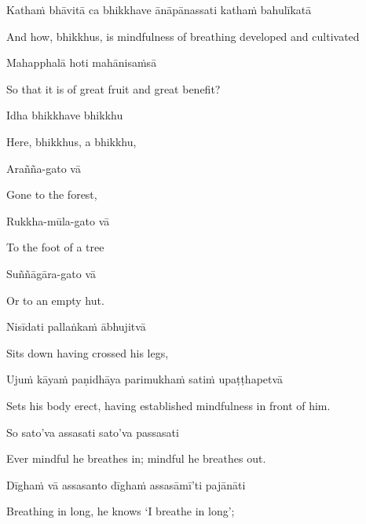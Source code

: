 Kathaṁ bhāvitā ca bhikkhave ānāpānassati kathaṁ bahulīkatā

\begin{english}
  And how, bhikkhus, is mindfulness of breathing developed and cultivated
\end{english}

Mahapphalā hoti mahānisaṁsā

\begin{english}
  So that it is of great fruit and great benefit?
\end{english}

Idha bhikkhave bhikkhu

\begin{english}
  Here, bhikkhus, a bhikkhu,
\end{english}

Arañña-gato vā

\begin{english}
  Gone to the forest,
\end{english}

Rukkha-mūla-gato vā

\begin{english}
  To the foot of a tree
\end{english}

Suññāgāra-gato vā

\begin{english}
  Or to an empty hut.
\end{english}

Nisīdati pallaṅkaṁ ābhujitvā

\begin{english}
  Sits down having crossed his legs,
\end{english}

Ujuṁ kāyaṁ paṇidhāya parimukhaṁ satiṁ upaṭṭhapetvā

\begin{english}
  Sets his body erect, having established mindfulness in front of him.
\end{english}

So sato'va assasati sato'va passasati

\begin{english}
  Ever mindful he breathes in; mindful he breathes out.
\end{english}

Dīghaṁ vā assasanto dīghaṁ assasāmī'ti pajānāti

\begin{english}
  Breathing in long, he knows `I breathe in long';
\end{english}

